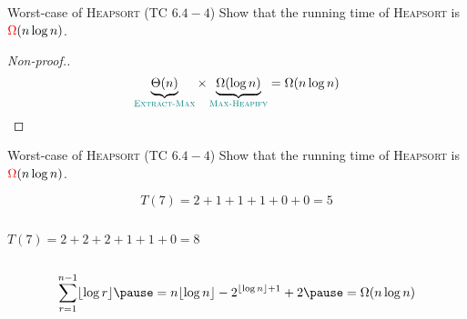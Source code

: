 \begin{frame}{}
  \begin{exampleblock}{Worst-case of \textsc{Heapsort} (TC $6.4-4$)}
    Show that the  running time of \textsc{Heapsort} is $\textcolor{red}{\Omega}(n \log n)$.
  \end{exampleblock}

  \pause
  \vspace{0.50cm}
  \centerline{}

  \pause
  \begin{proof}[Non-proof.]
    \[
      \underbrace{\Theta(n)}_{\textcolor{teal}{\textsc{Extract-Max}}} \times \underbrace{\Omega(\log n)}_{\textcolor{teal}{\textsc{Max-Heapify}}} = \Omega(n \log n)
    \]
  \end{proof}
\end{frame}

\begin{frame}{}
  \begin{exampleblock}{Worst-case of \textsc{Heapsort} (TC $6.4-4$)}
    Show that the  running time of \textsc{Heapsort} is $\textcolor{red}{\Omega}(n \log n)$.
  \end{exampleblock}

  \vspace{0.30cm}
\end{frame}

\begin{frame}{}
  \centerline{}

  \pause

  \pause
  \vspace{-0.30cm}
  \[
    T(7) = 2 + 1 + 1 + 1 + 0 + 0 = 5
  \]

\end{frame}

\begin{frame}{}
  \begin{columns}
      \pause
      \[
	T(7) = 2 + 2 + 2 + 1 + 1 + 0 = 8
      \]
      \pause \centerline{\footnotesize {}}
    \pause
  \end{columns}

  \pause
  \vspace{0.60cm}
  \[
    \sum_{r=1}^{n-1} \lfloor \log r \rfloor \pause = n \lfloor \log  n \rfloor - 2^{\lfloor \log n \rfloor + 1} + 2 \pause = \Omega(n \log n)
  \]
\end{frame}

